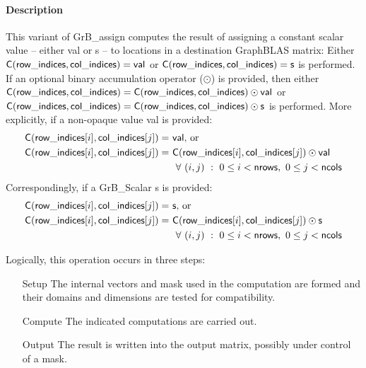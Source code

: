 \paragraph{Description}

This variant of {\sf GrB\_assign} computes the result of assigning a constant
scalar value -- either {\sf val} or {\sf s} -- to locations in a destination GraphBLAS matrix: 
Either
${\sf C}({\sf row\_indices, col\_indices}) = {\sf val}$ or ${\sf C}({\sf row\_indices, col\_indices}) = {\sf s}$ is performed.
If an optional binary accumulation operator ($\odot$) is provided, then either
${\sf C}({\sf row\_indices, col\_indices}) = {\sf C}({\sf row\_indices, col\_indices}) \odot {\sf val}$ or
${\sf C}({\sf row\_indices, col\_indices}) = {\sf C}({\sf row\_indices, col\_indices}) \odot {\sf s}$ is performed.
More explicitly, if a non-opaque value {\sf val} is provided:
\[
\begin{aligned}
	{\sf C}({\sf row\_indices}[i],{\sf col\_indices}[j]) =\ & {\sf val} \mbox{,~or~} \\
    {\sf C}({\sf row\_indices}[i],{\sf col\_indices}[j]) =\ & 
    {\sf C}({\sf row\_indices}[i],{\sf col\_indices}[j]) \odot {\sf val} \\
    & \ \forall \ (i,j) \ : \ 0 \leq i < {\sf nrows},\ 0 \leq j < {\sf ncols}
\end{aligned}
\]  
Correspondingly, if a {\sf GrB\_Scalar} {\sf s} is provided:
\[
\begin{aligned}
	{\sf C}({\sf row\_indices}[i],{\sf col\_indices}[j]) =\ & {\sf s} \mbox{,~or~} \\
    {\sf C}({\sf row\_indices}[i],{\sf col\_indices}[j]) =\ & 
    {\sf C}({\sf row\_indices}[i],{\sf col\_indices}[j]) \odot {\sf s} \\
    & \ \forall \ (i,j) \ : \ 0 \leq i < {\sf nrows},\ 0 \leq j < {\sf ncols}
\end{aligned}
\]

Logically, this operation occurs in three steps:
\begin{enumerate}[leftmargin=0.85in]
\item[Setup] The internal vectors and mask used in the computation are formed 
and their domains and dimensions are tested for compatibility.
\item[Compute] The indicated computations are carried out.
\item[Output] The result is written into the output matrix, possibly under 
control of a mask.
\end{enumerate}

